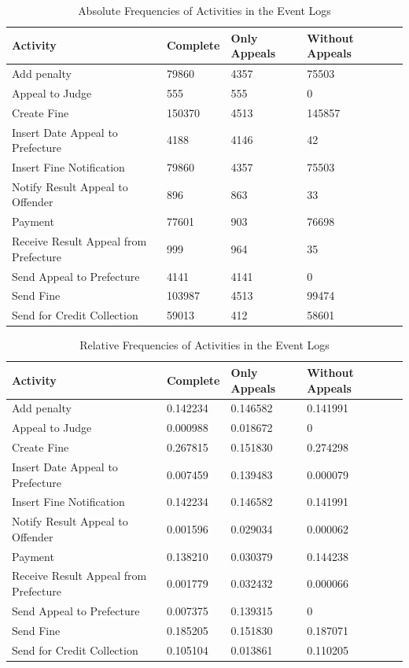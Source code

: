 \documentclass[12pt]{report}
\begin{document}
\begin{table}[H]
\centering
\begin{tabular}{|l|l|l|l|l|}
\hline \textbf{Activity} & \textbf{Complete} & \textbf{Only Appeals} & \textbf{Without Appeals} \\
\hline Add penalty & 79860 & 4357 & 75503\\
\hline Appeal to Judge & 555 & 555 &0\\
\hline Create Fine & 150370 & 4513 & 145857\\
\hline Insert Date Appeal to Prefecture & 4188 & 4146 & 42\\
\hline Insert Fine Notification & 79860 & 4357 & 75503\\
\hline Notify Result Appeal to Offender & 896 & 863 & 33\\
\hline Payment  & 77601 & 903 & 76698\\
\hline Receive Result Appeal from Prefecture & 999 & 964 & 35\\
\hline Send Appeal to Prefecture  & 4141 & 4141 & 0\\
\hline Send Fine  & 103987 & 4513 & 99474\\
\hline Send for Credit Collection & 59013 & 412 & 58601\\
\hline
\end{tabular}
\caption{Absolute Frequencies of Activities in the Event Logs}
\label{tab:1c_absolut}
\end{table}

\begin{table}[H]
\centering
\begin{tabular}{|l|l|l|l|l|}
\hline \textbf{Activity} & \textbf{Complete} & \textbf{Only Appeals} & \textbf{Without Appeals} \\
\hline Add penalty & 0.142234 & 0.146582 & 0.141991\\
\hline Appeal to Judge & 0.000988 & 0.018672 &0\\
\hline Create Fine & 0.267815 & 0.151830 & 0.274298\\
\hline Insert Date Appeal to Prefecture & 0.007459 & 0.139483 & 0.000079\\
\hline Insert Fine Notification & 0.142234 & 0.146582 & 0.141991\\
\hline Notify Result Appeal to Offender & 0.001596 & 0.029034 & 0.000062\\
\hline Payment  & 0.138210 & 0.030379 & 0.144238\\
\hline Receive Result Appeal from Prefecture & 0.001779 & 0.032432 & 0.000066\\
\hline Send Appeal to Prefecture  & 0.007375 & 0.139315 & 0\\
\hline Send Fine  & 0.185205 & 0.151830 & 0.187071\\
\hline Send for Credit Collection & 0.105104 & 0.013861 & 0.110205\\
\hline
\end{tabular}
\caption{Relative Frequencies of Activities in the Event Logs}
\label{tab:1c_relative}
\end{table}
\end{document}
